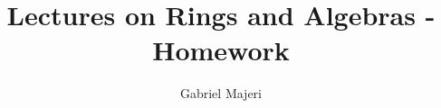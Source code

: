 \documentclass[12pt]{article}
\title{Lectures on Rings and Algebras - Homework}
\author{Gabriel Majeri}
\date{
}
\theoremstyle{definition}
\begin{document}
\maketitle

\begingroup
\let\clearpage\relax








\endgroup
\end{document}
